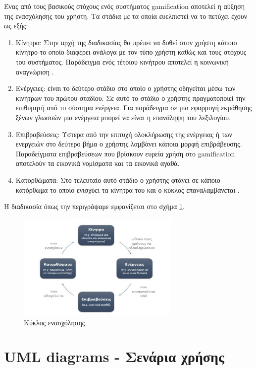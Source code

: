 	Ένας από τους βασικούς στόχους ενός συστήματος gamification αποτελεί η αύξηση της ενασχόλησης του χρήστη. Τα στάδια με τα οποία ευελπιστεί να το πετύχει έχουν ως εξής:
	\begin{enumerate}
		\item Κίνητρα: Στην αρχή της διαδικασίας θα πρέπει να δοθεί στον χρήστη κάποιο κίνητρο το οποίο διαφέρει ανάλογα με τον τύπο χρήστη καθώς και τους στόχους του συστήματος. Παράδειγμα ενός τέτοιου κινήτρου αποτελεί η κοινωνική αναγνώριση \cite{Gamification_on_Participation}.
		\item Ενέργειες: είναι το δεύτερο στάδιο στο οποίο ο χρήστης οδηγείται μέσω των κινήτρων του πρώτου σταδίου. Σε αυτό το στάδιο ο χρήστης πραγματοποιεί την επιθυμητή από το σύστημα ενέργεια. Για παράδειγμα σε μια εφαρμογή εκμάθησης ξένων γλωσσών μια ενέργεια μπορεί να είναι η επανάληψη του λεξιλογίου.
		\item Επιβραβεύσεις: Ύστερα από την επιτυχή ολοκλήρωσης της ενέργειας ή των ενεργειών στο δεύτερο βήμα ο χρήστης λαμβάνει κάποια μορφή επιβράβευσης. Παραδείγματα επιβραβεύσεων που βρίσκουν ευρεία χρήση στο gamification αποτελούν τα εικονικά νομίσματα και τα εικονικά αγαθά.
		\item Κατορθώματα: Στο τελευταίο αυτό στάδιο ο χρήστης φτάνει σε κάποιο κατόρθωμα το οποίο ενισχύει τα κίνητρα του και ο κύκλος επαναλαμβάνεται \cite{GamificationDesign}.
	\end{enumerate}
	Η διαδικασία όπως την περιγράψαμε εμφανίζεται στο σχήμα \ref{fig:engagement_loop}.
	\begin{figure}[h]
	    \centering
	    \includegraphics[width=0.7\textwidth]{engagement_loop.jpg}
	    \caption{Κύκλος ενασχόλησης}
	    \label{fig:engagement_loop}
	\end{figure}
\section{UML diagrams - Σενάρια χρήσης  }

